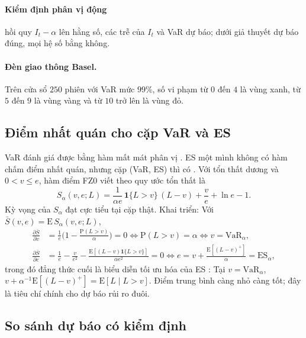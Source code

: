 \documentclass[12pt,a4paper]{article}
\theoremstyle{definition}
\theoremstyle{remark}
\newcommand{\E}{\mathrm{E}}
\newcommand{\Prob}{\mathrm{P}}
\newcommand{\VaR}{\mathrm{VaR}}
\newcommand{\ES}{\mathrm{ES}}
\newcommand{\ind}{\mathbf{1}}
\begin{document}
\paragraph{Kiểm định phân vị động} \cite{engle_manganelli2004} hồi quy $I_t-\alpha$ lên hằng số, các trễ của $I_t$ và VaR dự báo; dưới giả thuyết dự báo đúng, mọi hệ số bằng không.

\paragraph{Đèn giao thông Basel.} Trên cửa sổ $250$ phiên với VaR mức $99\%$, số vi phạm từ $0$ đến $4$ là vùng xanh, từ $5$ đến $9$ là vùng vàng và từ $10$ trở lên là vùng đỏ.

\subsection{Điểm nhất quán cho cặp VaR và ES}

VaR đánh giá được bằng hàm mất mát phân vị \cite{koenker1978,gneiting2011}. ES một mình không có hàm chấm điểm nhất quán, nhưng cặp (VaR, ES) thì có \cite{fissler2016}. Với tổn thất dương và $0<v\le e$, hàm điểm FZ0 \cite{pzc2019} viết theo quy ước tổn thất là
\begin{equation}\label{eq:fz0}
S_\alpha(v,e;L)=\frac{1}{\alpha e}\,\ind\{L>v\}\,(L-v)+\frac{v}{e}+\ln e-1 .
\end{equation}
Kỳ vọng của $S_\alpha$ đạt cực tiểu tại cặp thật. Khai triển: Với $\bar S(v,e)=\E\,S_\alpha(v,e;L)$,
\begin{align*}
\frac{\partial\bar S}{\partial v}&=\frac1e\Big(1-\frac{\Prob(L>v)}{\alpha}\Big)=0\iff\Prob(L>v)=\alpha\iff v=\VaR_\alpha,\\
\frac{\partial\bar S}{\partial e}&=\frac1e-\frac{v}{e^{2}}-\frac{\E[(L-v)\ind\{L>v\}]}{\alpha e^{2}}=0\iff e=v+\frac{\E[(L-v)^{+}]}{\alpha}=\ES_\alpha ,
\end{align*}
trong đó đẳng thức cuối là biểu diễn tối ưu hóa của ES \cite{rockafellar2000}: Tại $v=\VaR_\alpha$, $v+\alpha^{-1}\E[(L-v)^+]=\E[L\mid L>v]$. Điểm trung bình càng nhỏ càng tốt; đây là tiêu chí chính cho dự báo rủi ro đuôi.

\subsection{So sánh dự báo có kiểm định}\label{sec:sosanh}
\end{document}
